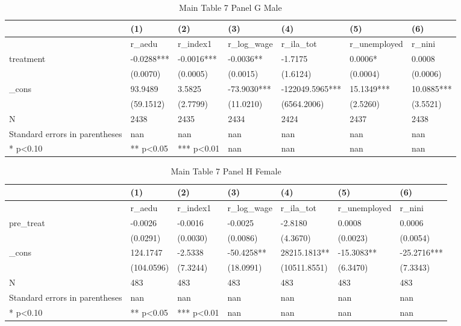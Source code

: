 \documentclass[11pt]{article}
\begin{document}
\clearpage
\begin{table}[!htbp]
\centering
\caption{Main Table 7 Panel G Male}
\label{tab:table7g_m}
\begin{tabular}{lllllll}
\toprule
 & (1) & (2) & (3) & (4) & (5) & (6) \\
\midrule
 & r\_aedu & r\_index1 & r\_log\_wage & r\_ila\_tot & r\_unemployed & r\_nini \\
treatment & -0.0288*** & -0.0016*** & -0.0036** & -1.7175 & 0.0006* & 0.0008 \\
 & (0.0070) & (0.0005) & (0.0015) & (1.6124) & (0.0004) & (0.0006) \\
\_cons & 93.9489 & 3.5825 & -73.9030*** & -122049.5965*** & 15.1349*** & 10.0885*** \\
 & (59.1512) & (2.7799) & (11.0210) & (6564.2006) & (2.5260) & (3.5521) \\
N & 2438 & 2435 & 2434 & 2424 & 2437 & 2438 \\
Standard errors in parentheses & nan & nan & nan & nan & nan & nan \\
* p<0.10 & ** p<0.05 & *** p<0.01 & nan & nan & nan & nan \\
\bottomrule
\end{tabular}

\end{table}

\clearpage
\begin{table}[!htbp]
\centering
\caption{Main Table 7 Panel H Female}
\label{tab:table7h_f}
\begin{tabular}{lllllll}
\toprule
 & (1) & (2) & (3) & (4) & (5) & (6) \\
\midrule
 & r\_aedu & r\_index1 & r\_log\_wage & r\_ila\_tot & r\_unemployed & r\_nini \\
pre\_treat & -0.0026 & -0.0016 & -0.0025 & -2.8180 & 0.0008 & 0.0006 \\
 & (0.0291) & (0.0030) & (0.0086) & (4.3670) & (0.0023) & (0.0054) \\
\_cons & 124.1747 & -2.5338 & -50.4258** & 28215.1813** & -15.3083** & -25.2716*** \\
 & (104.0596) & (7.3244) & (18.0991) & (10511.8551) & (6.3470) & (7.3343) \\
N & 483 & 483 & 483 & 483 & 483 & 483 \\
Standard errors in parentheses & nan & nan & nan & nan & nan & nan \\
* p<0.10 & ** p<0.05 & *** p<0.01 & nan & nan & nan & nan \\
\bottomrule
\end{tabular}

\end{table}
\end{document}
